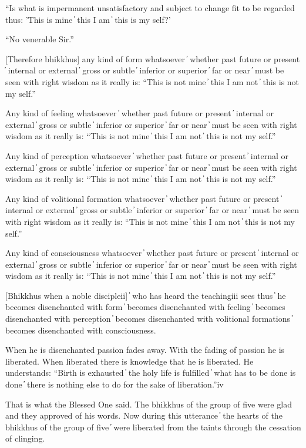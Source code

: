 “Is what is impermanent unsatisfactory and subject to change fit to be regarded thus: 'This is mine  ̓  this I am  ̓  this is my self?'

“No venerable Sir.”

[Therefore bhikkhus] any kind of form whatsoever  ̓  whether past future or present  ̓  internal or external  ̓  gross or subtle  ̓  inferior or superior  ̓  far or near  ̓  must be seen with right wisdom as it really is: “This is not mine  ̓  this I am not  ̓  this is not my self.”

Any kind of feeling whatsoever  ̓  whether past future or present  ̓  internal or external  ̓  gross or subtle  ̓  inferior or superior  ̓  far or near  ̓  must be seen with right wisdom as it really is: “This is not mine  ̓  this I am not  ̓  this is not my self.”

Any kind of perception whatsoever  ̓  whether past future or present  ̓  internal or external  ̓  gross or subtle  ̓  inferior or superior  ̓  far or near  ̓  must be seen with right wisdom as it really is: “This is not mine  ̓  this I am not  ̓  this is not my self.”

Any kind of volitional formation whatsoever  ̓  whether past future or present  ̓  internal or external  ̓  gross or subtle  ̓  inferior or superior  ̓  far or near  ̓  must be seen with right wisdom as it really is: “This is not mine  ̓  this I am not  ̓  this is not my self.”

Any kind of consciousness whatsoever  ̓  whether past future or present  ̓  internal or external  ̓  gross or subtle  ̓  inferior or superior  ̓  far or near  ̓  must be seen with right wisdom as it really is: “This is not mine  ̓  this I am not  ̓  this is not my self.”

[Bhikkhus when a noble discipleii]  ̓  who has heard the teachingiii sees thus  ̓  he becomes disenchanted with form  ̓  becomes disenchanted with feeling  ̓  becomes disenchanted with perception  ̓  becomes disenchanted with volitional formations  ̓  becomes disenchanted with consciousness.

When he is disenchanted passion fades away. With the fading of passion he is liberated. When liberated there is knowledge that he is liberated. He understands: “Birth is exhausted  ̓  the holy life is fulfilled  ̓  what has to be done is done  ̓  there is nothing else to do for the sake of liberation.”iv

That is what the Blessed One said. The bhikkhus of the group of five were glad and they approved of his words. Now during this utterance  ̓  the hearts of the bhikkhus of the group of five  ̓  were liberated from the taints through the cessation of clinging.

\suttaRef{[SN 22.59]}
